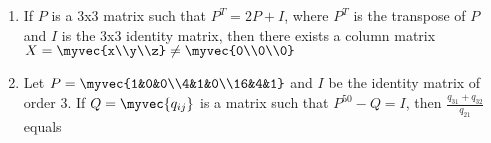 \begin{enumerate}
            \item If $P$ is a 3x3 matrix such that $P^T = 2P +I$, where $P^T$ is the transpose of $P$ and $I$ is the 3x3 identity matrix, then there exists a column matrix $X=\myvec{x\\y\\z} \neq \myvec{0\\0\\0}$
                \hfill{}
                \begin{enumerate}

                \end{enumerate}

            \item Let $P=\myvec{1&0&0\\4&1&0\\16&4&1}$ and $I$ be the identity matrix of order 3. If $Q = \myvec{q_{ij}}$ is a matrix such that $P^{50} -Q =I$, then $\frac{q_{31}+q_{32}}{q_{21}}$ equals
                \hfill{}
                \begin{enumerate}

                \end{enumerate}


\end{enumerate}
